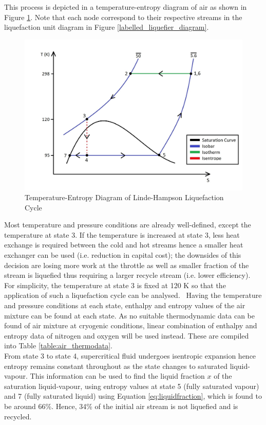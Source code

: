         This process is depicted in a temperature-entropy diagram of air as shown in Figure \ref{liquefier_T-S_diagram}. Note that each node correspond to their respective streams in the liquefaction unit diagram in Figure \ref{labelled_liquefier_diagram}. \\
        \begin{figure}[H]
            \centering
            \includegraphics[width=0.75\linewidth]{airseparation/graphics/liquefier_T-S_diagram.jpg}
            \caption{Temperature-Entropy Diagram of Linde-Hampson Liquefaction Cycle}
            \label{liquefier_T-S_diagram}
        \end{figure}
        \noindent Most temperature and pressure conditions are already well-defined, except the temperature at state 3. If the temperature is increased at state 3, less heat exchange is required between the cold and hot streams hence a smaller heat exchanger can be used (i.e. reduction in capital cost); the downsides of this decision are losing more work at the throttle as well as smaller fraction of the stream is liquefied thus requiring a larger recycle stream (i.e. lower efficiency). For simplicity, the temperature at state 3 is fixed at 120 K so that the application of such a liquefaction cycle can be analysed. \
        \noindent Having the temperature and pressure conditions at each state, enthalpy and entropy values of the air mixture can be found at each state. As no suitable thermodynamic data can be found of air mixture at cryogenic conditions, linear combination of enthalpy and entropy data of nitrogen and oxygen will be used instead. These are compiled into Table \ref{table:air_thermodata}. \\
        From state 3 to state 4, supercritical fluid undergoes isentropic expansion hence entropy remains constant throughout as the state changes to saturated liquid-vapour. This information can be used to find the liquid fraction $x$ of the saturation liquid-vapour, using entropy values at state 5 (fully saturated vapour) and 7 (fully saturated liquid) using Equation \ref{eq:liquidfraction}, which is found to be around 66\%. Hence, 34\% of the initial air stream is not liquefied and is recycled.
